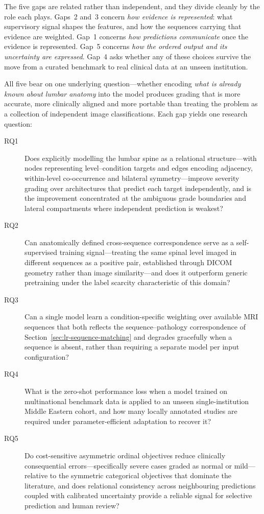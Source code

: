 The five gaps are related rather than independent, and they divide cleanly by the
role each plays. Gaps~2 and~3 concern \emph{how evidence is represented}: what
supervisory signal shapes the features, and how the sequences carrying that
evidence are weighted. Gap~1 concerns \emph{how predictions communicate} once the
evidence is represented. Gap~5 concerns \emph{how the ordered output and its
uncertainty are expressed}. Gap~4 asks whether any of these choices survive the
move from a curated benchmark to real clinical data at an unseen institution.

All five bear on one underlying question---whether encoding \emph{what is already
known about lumbar anatomy} into the model produces grading that is more
accurate, more clinically aligned and more portable than treating the problem as
a collection of independent image classifications. Each gap yields one research
question:

\begin{description}
  \item[RQ1] Does explicitly modelling the lumbar spine as a relational
  structure---with nodes representing level--condition targets and edges
  encoding adjacency, within-level co-occurrence and bilateral symmetry---improve
  severity grading over architectures that predict each target independently,
  and is the improvement concentrated at the ambiguous grade boundaries and
  lateral compartments where independent prediction is weakest?

  \item[RQ2] Can anatomically defined cross-sequence correspondence serve as a
  self-supervised training signal---treating the same spinal level imaged in
  different sequences as a positive pair, established through DICOM geometry
  rather than image similarity---and does it outperform generic pretraining
  under the label scarcity characteristic of this domain?

  \item[RQ3] Can a single model learn a condition-specific weighting over
  available MRI sequences that both reflects the sequence--pathology
  correspondence of Section~\ref{sec:lr-sequence-matching} and degrades
  gracefully when a sequence is absent, rather than requiring a separate model
  per input configuration?

  \item[RQ4] What is the zero-shot performance loss when a model trained on
  multinational benchmark data is applied to an unseen single-institution
  Middle Eastern cohort, and how many locally annotated studies are required
  under parameter-efficient adaptation to recover it?

  \item[RQ5] Do cost-sensitive asymmetric ordinal objectives reduce clinically
  consequential errors---specifically severe cases graded as normal or mild---relative to
  the symmetric categorical objectives that dominate the literature, and does
  relational consistency across neighbouring predictions coupled with calibrated
  uncertainty provide a reliable signal for selective prediction and human review?
\end{description}

